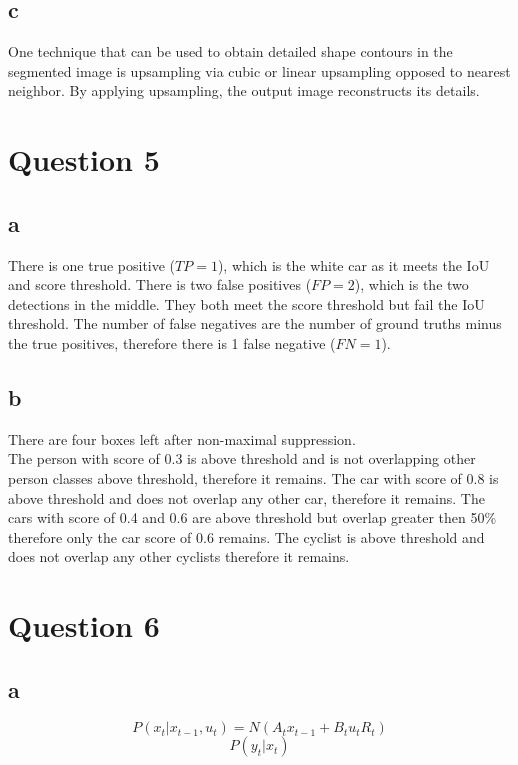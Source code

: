 \documentclass[12pt]{article}
\begin{document}
\subsection{c}
One technique that can be used to obtain detailed shape contours in the segmented image is upsampling via cubic or linear upsampling opposed to nearest neighbor. By applying upsampling, the output image reconstructs its details.

\section{Question 5}
\subsection{a}
There is one true positive ($TP=1$), which is the white car as it meets the IoU and score threshold.
There is two false positives ($FP=2$), which is the two detections in the middle. They both meet the score threshold but fail the IoU threshold.
The number of false negatives are the number of ground truths minus the true positives, therefore there is 1 false negative ($FN=1$).


\subsection{b}
There are four boxes left after non-maximal suppression. \\
The person with score of 0.3 is above threshold and is not overlapping other person classes above threshold, therefore it remains.
The car with score of 0.8 is above threshold and does not overlap any other car, therefore it remains.
The cars with score of 0.4 and 0.6 are above threshold but overlap greater then 50\% therefore only the car score of 0.6 remains.
The cyclist is above threshold and does not overlap any other cyclists therefore it remains.

\section{Question 6}
\subsection{a}
\begin{equation*}
    P(x_t | x_{t-1}, u_t) = N(A_tx_{t-1} + B_tu_tR_t)
\end{equation*}
\begin{equation*}
    P(y_t|x_t)
\end{equation*}
\end{document}
